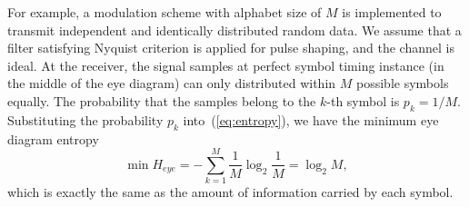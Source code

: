 \documentclass[journal,comsoc, onecolumn, 12pt,draftclsnofoot]{IEEEtran} %
\begin{document}
For example, a modulation scheme with alphabet size of \(M\) is implemented to transmit independent and identically distributed random data. 
We assume that a filter satisfying Nyquist criterion is applied for pulse shaping, and the channel is ideal.
At the receiver, the signal samples at perfect symbol timing instance (in the middle of the eye diagram) can only distributed within \(M\) possible symbols equally.
The probability that the samples belong to the $k$-th symbol is \(p_k=1/M\).
Substituting the probability \(p_k\) into~(\ref{eq:entropy}), we have the minimum eye diagram entropy
\begin{equation}
\min{H_{eye}} =  - \sum\limits_{k = 1}^M {{\frac{1}{M}}\log_2 {\frac{1}{M}}}=\log_2 {M},
\label{eq:entropy_mid}
\end{equation}
which is exactly the same as the amount of information carried by each symbol.
\end{document}
